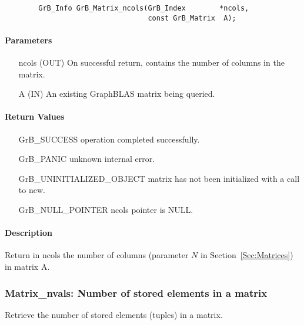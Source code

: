 \begin{verbatim}
        GrB_Info GrB_Matrix_ncols(GrB_Index        *ncols,
                                  const GrB_Matrix  A);
\end{verbatim}

\paragraph{Parameters}

\begin{itemize}[leftmargin=1.1in]
    \item[{\sf ncols}] ({\sf OUT}) On successful return, contains the number of columns in the matrix.
    \item[{\sf A}] ({\sf IN}) An existing GraphBLAS matrix being queried.
\end{itemize}

\paragraph{Return Values}

\begin{itemize}[leftmargin=2.1in]
\item[{\sf GrB\_SUCCESS}]   operation completed successfully.
\item[{\sf GrB\_PANIC}]     unknown internal error.
\item[{\sf GrB\_UNINITIALIZED\_OBJECT}]  matrix has not been initialized with a call to {\sf new}.
\item[{\sf GrB\_NULL\_POINTER}]    {\sf ncols} pointer is {\sf NULL}.
\end{itemize}

\paragraph{Description}

Return in {\sf ncols} the number of columns (parameter $N$ in Section~\ref{Sec:Matrices}) in matrix {\sf A}.

\subsubsection{{\sf Matrix\_nvals}: Number of stored elements in a matrix}
\label{Sec:Matrix_nvals}

Retrieve the number of stored elements (tuples) in a matrix.

